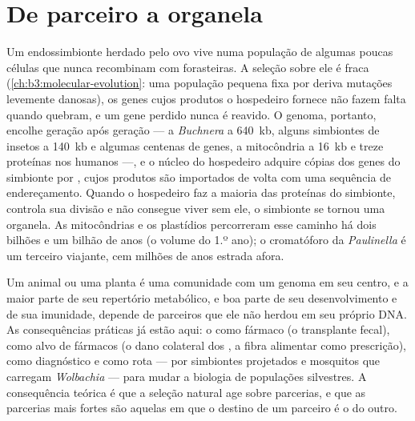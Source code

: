 \section{De parceiro a organela}

\begin{proposition}\label{prop:b3:microbiomes:reduction}
Um endossimbionte herdado pelo ovo vive numa população de algumas
poucas células que nunca recombinam com forasteiras. A seleção sobre
ele é fraca (\cref{ch:b3:molecular-evolution}: uma população pequena
fixa por deriva mutações levemente danosas), os genes cujos produtos o
hospedeiro fornece não fazem falta quando quebram, e um gene perdido
nunca é reavido. O genoma, portanto, encolhe geração após geração --- a
\emph{Buchnera} a \qty{640}{kb}, alguns simbiontes de insetos a
\qty{140}{kb} e algumas centenas de genes, a mitocôndria a
\qty{16}{kb} e treze proteínas nos humanos ---, e o núcleo do
hospedeiro adquire cópias dos genes do simbionte por
\emph{}, cujos produtos são
importados de volta com uma sequência de endereçamento. Quando o
hospedeiro faz a maioria das proteínas do simbionte, controla sua
divisão e não consegue viver sem ele, o simbionte se tornou uma
organela. As mitocôndrias e os plastídios percorreram esse caminho há
dois bilhões e um bilhão de anos (o volume do 1.º ano); o cromatóforo
da \emph{Paulinella} é um terceiro viajante, cem milhões de anos
estrada afora.
\end{proposition}

\begin{remark}\label{rem:b3:microbiomes:individual}
Um animal ou uma planta é uma comunidade com um genoma em seu centro, e
a maior parte de seu repertório metabólico, e boa parte de seu
desenvolvimento e de sua imunidade, depende de parceiros que ele não
herdou em seu próprio DNA. As consequências práticas já estão aqui: o
 como fármaco (o transplante fecal), como alvo de fármacos (o
dano colateral dos , a fibra alimentar como prescrição),
como diagnóstico e como rota --- por simbiontes projetados e mosquitos
que carregam \emph{Wolbachia} --- para mudar a biologia de populações
silvestres. A consequência teórica é que a seleção natural age sobre
parcerias, e que as parcerias mais fortes são aquelas em que o destino
de um parceiro é o do outro.
\end{remark}

